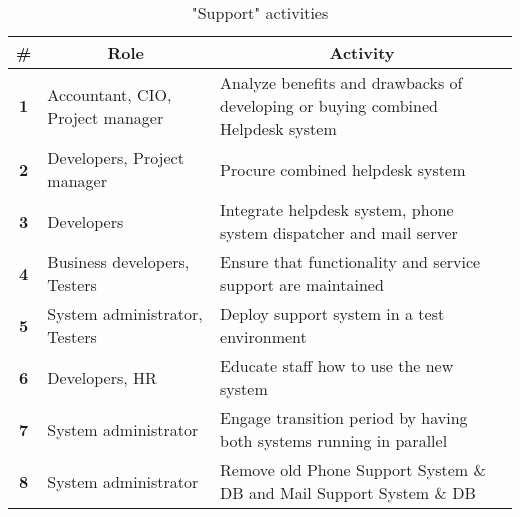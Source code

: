 \begin{table}[H]
	\centering
	\begin{tabular}{|c|p{3cm}|p{10.5cm}|}
		\hline
		\textbf{\#} & \multicolumn{1}{c|}{\textbf{Role}} & \multicolumn{1}{c|}{\textbf{Activity}} \\ \hline
		\textbf{1} & Accountant, CIO, Project manager & Analyze benefits and drawbacks of developing or buying combined Helpdesk system \\ \hline
		\textbf{2} & Developers, Project manager & Procure combined helpdesk system\\ \hline
		\textbf{3} & Developers & Integrate helpdesk system, phone system dispatcher and mail server \\ \hline
		\textbf{4} & Business developers, Testers & Ensure that functionality and service support are maintained \\ \hline
		\textbf{5} & System administrator, Testers & Deploy support system in a test environment\\ \hline
		\textbf{6} & Developers, HR & Educate staff how to use the new system\\ \hline
		\textbf{7} & System administrator & Engage transition period by having both systems running in parallel\\ \hline
		\textbf{8} & System administrator & Remove old Phone Support System \& DB and Mail Support System \& DB\\ \hline
	\end{tabular}	
	\caption{"Support" activities}
	\label{table:activities_support}
\end{table}
